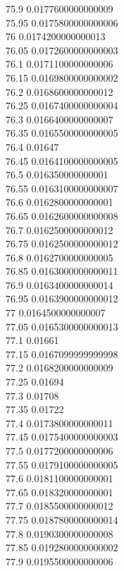 {75.9	0.0177600000000009\\
75.95	0.0175800000000006\\
76	0.0174200000000013\\
76.05	0.0172600000000003\\
76.1	0.0171100000000006\\
76.15	0.0169800000000002\\
76.2	0.0168600000000012\\
76.25	0.0167400000000004\\
76.3	0.0166400000000007\\
76.35	0.0165500000000005\\
76.4	0.01647\\
76.45	0.0164100000000005\\
76.5	0.016350000000001\\
76.55	0.0163100000000007\\
76.6	0.0162800000000001\\
76.65	0.0162600000000008\\
76.7	0.0162500000000012\\
76.75	0.0162500000000012\\
76.8	0.0162700000000005\\
76.85	0.0163000000000011\\
76.9	0.0163400000000014\\
76.95	0.0163900000000012\\
77	0.0164500000000007\\
77.05	0.0165300000000013\\
77.1	0.01661\\
77.15	0.0167099999999998\\
77.2	0.0168200000000009\\
77.25	0.01694\\
77.3	0.01708\\
77.35	0.01722\\
77.4	0.0173800000000011\\
77.45	0.0175400000000003\\
77.5	0.0177200000000006\\
77.55	0.0179100000000005\\
77.6	0.0181100000000001\\
77.65	0.018320000000001\\
77.7	0.0185500000000012\\
77.75	0.0187800000000014\\
77.8	0.0190300000000008\\
77.85	0.0192800000000002\\
77.9	0.0195500000000006\\
}
